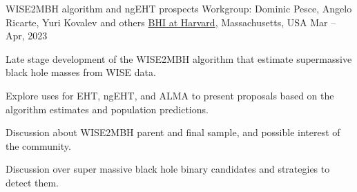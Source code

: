 
\begin{cventries}

  \cventry
    {WISE2MBH algorithm and ngEHT prospects}
    {Workgroup: Dominic Pesce, Angelo Ricarte, Yuri Kovalev and others}
    {\href{https://bhi.fas.harvard.edu/}{BHI at Harvard}, Massachusetts, USA}
    {Mar -- Apr, 2023}
    {
      \begin{cvitems}
        \item{Late stage development of the WISE2MBH algorithm that estimate supermassive black hole masses from WISE data.}
        \item{Explore uses for EHT, ngEHT, and ALMA to present proposals based on the algorithm estimates and population predictions.}
        \item {Discussion about WISE2MBH parent and final sample, and possible interest of the community.}
        \item{Discussion over super massive black hole binary candidates and strategies to detect them.}
      \end{cvitems}
    }
    

\end{cventries}
